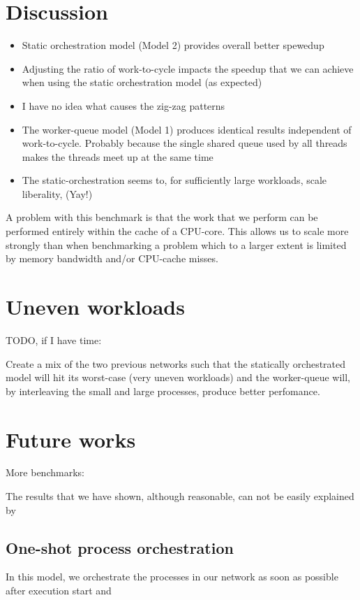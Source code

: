 \section{Discussion}
\begin{itemize}
\item Static orchestration model (Model 2) provides overall better spewedup
\item Adjusting the ratio of work-to-cycle impacts the speedup that we
  can achieve when using the static orchestration model (as expected)
\item I have no idea what causes the zig-zag patterns
\item The worker-queue model (Model 1) produces identical results
  independent of work-to-cycle. Probably because the single shared
  queue used by all threads makes the threads meet up at the same time 
\item The static-orchestration seems to, for sufficiently large
  workloads, scale liberality, (Yay!)
\end{itemize}


A problem with this benchmark is that the work that we perform can be
performed entirely within the cache of a CPU-core. This allows us to
scale more strongly than when benchmarking a problem which to a larger
extent is limited by memory bandwidth and/or CPU-cache misses.

\section{Uneven workloads}
TODO, if I have time:

Create a mix of the two previous networks such that the statically
orchestrated model will hit its worst-case (very uneven workloads) and
the worker-queue will, by interleaving the small and large processes,
produce better perfomance.


\section{Future works}

More benchmarks:


The results that we have shown, although reasonable, can not be easily
explained by 

\subsection{One-shot process orchestration}
In this model, we orchestrate the processes in our network as soon as
possible after execution start and

